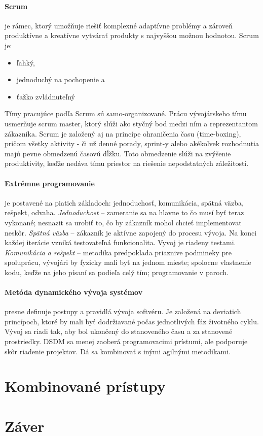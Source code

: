 \documentclass[10pt,twoside,slovak,a4paper]{article}
\begin{document}
\paragraph{Scrum}je rámec, ktorý umožňuje riešiť komplexné adaptívne problémy a zároveň produktívne a kreatívne vytvárať produkty s najvyššou možnou hodnotou. Scrum je: 
\begin{itemize}
\item  ľahký,
\item jednoduchý na pochopenie a
\item ťažko zvládnuteľný
\end{itemize}
Tímy pracujúce podľa Scrum sú samo-organizované. Prácu vývojárskeho tímu usmerňuje scrum master, ktorý slúži ako styčný bod medzi ním a reprezentantom zákazníka. Scrum je založený aj na princípe ohraničenia času (time-boxing), pričom všetky aktivity - či už denné porady, sprint-y alebo akékoľvek rozhodnutia majú pevne obmedzenú časovú dĺžku. Toto obmedzenie slúži na zvýšenie produktivity, keďže nedáva tímu priestor na riešenie nepodstatných záležitostí. 

\paragraph{Extrémne programovanie}je postavené na piatich základoch: jednoduchosť, komunikácia, spätná väzba, rešpekt, odvaha.
\emph{Jednoduchost} – zameranie sa na hlavne to čo musí byť teraz vykonané; nesnazit sa urobiť to, čo by zákazník mohol chcieť implementovat neskôr.
\emph{Spätná väzba} – zákazník je aktívne zapojený do procesu vývoja. Na konci každej iterácie vzniká testovateľná funkcionalita. Vyvoj je riadeny testami. 
\emph{Komunikácia a rešpekt} – metodika predpoklada priaznive podmineky pre spoluprácu, vývojári by fyzicky mali byť na jednom mieste; spolocne vlastnenie kodu, keďže na jeho písaní sa podieľa celý tím; programovanie v paroch.
\paragraph{Metóda dynamického vývoja systémov}presne definuje postupy a pravidlá vývoja softvéru. Je založená na deviatich princípoch, ktoré by mali byť dodržiavané počas jednotlivých fáz životného cyklu. Vývoj sa riadi tak, aby bol ukončený do stanoveného času a za stanovené prostriedky. DSDM sa menej zaoberá programovacimi prístumi, ale podporuje skôr riadenie projektov. Dá sa kombinovať s inými agilnými metodikami.

\section{Kombinované prístupy}


\section{Záver}



\end{document}
